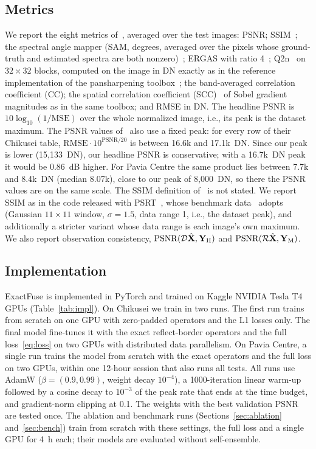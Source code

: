 \documentclass[journal]{IEEEtran}
\begin{document}
\subsection{Metrics}
\label{sec:metrics}
We report the eight metrics of~\cite{chen2026twostage}, averaged over the test images: PSNR; SSIM~\cite{wang2004ssim}; the spectral angle mapper (SAM, degrees, averaged over the pixels whose ground-truth and estimated spectra are both nonzero)~\cite{yuhas1992sam}; ERGAS with ratio 4~\cite{wald2000ergas}; Q2n~\cite{garzelli2009q2n} on $32\times32$ blocks, computed on the image in DN exactly as in the reference implementation of the pansharpening toolbox~\cite{vivone2015critical,deng2022machine}; the band-averaged correlation coefficient (CC); the spatial correlation coefficient (SCC)~\cite{zhou1998scc} of Sobel gradient magnitudes as in the same toolbox; and RMSE in DN. The headline PSNR is $10\log_{10}(1/\mathrm{MSE})$ over the whole normalized image, i.e., its peak is the dataset maximum. The PSNR values of~\cite{chen2026twostage} also use a fixed peak: for every row of their Chikusei table, $\mathrm{RMSE}\cdot10^{\mathrm{PSNR}/20}$ is between 16.6k and 17.1k~DN. Since our peak is lower (15{,}133~DN), our headline PSNR is conservative; with a 16.7k~DN peak it would be 0.86~dB higher. For Pavia Centre the same product lies between 7.7k and 8.4k~DN (median 8.07k), close to our peak of 8{,}000~DN, so there the PSNR values are on the same scale. The SSIM definition of~\cite{chen2026twostage} is not stated. We report SSIM as in the code released with PSRT~\cite{deng2023psrt}, whose benchmark data~\cite{chen2026twostage} adopts (Gaussian $11\times11$ window, $\sigma=1.5$, data range 1, i.e., the dataset peak), and additionally a stricter variant whose data range is each image's own maximum. We also report observation consistency, $\mathrm{PSNR}(\mathcal{D}\hat{\mathbf{X}},\mathbf{Y}_{\mathrm{H}})$ and $\mathrm{PSNR}(\mathcal{R}\hat{\mathbf{X}},\mathbf{Y}_{\mathrm{M}})$.

\subsection{Implementation}
ExactFuse is implemented in PyTorch and trained on Kaggle NVIDIA Tesla T4 GPUs (Table~\ref{tab:impl}). On Chikusei we train in two runs. The first run trains from scratch on one GPU with zero-padded operators and the L1 losses only. The final model fine-tunes it with the exact reflect-border operators and the full loss~\eqref{eq:loss} on two GPUs with distributed data parallelism. On Pavia Centre, a single run trains the model from scratch with the exact operators and the full loss on two GPUs, within one 12-hour session that also runs all tests. All runs use AdamW ($\beta=(0.9,0.99)$, weight decay $10^{-4}$), a 1000-iteration linear warm-up followed by a cosine decay to $10^{-3}$ of the peak rate that ends at the time budget, and gradient-norm clipping at 0.1. The weights with the best validation PSNR are tested once. The ablation and benchmark runs (Sections~\ref{sec:ablation} and~\ref{sec:bench}) train from scratch with these settings, the full loss and a single GPU for 4~h each; their models are evaluated without self-ensemble.
\end{document}
